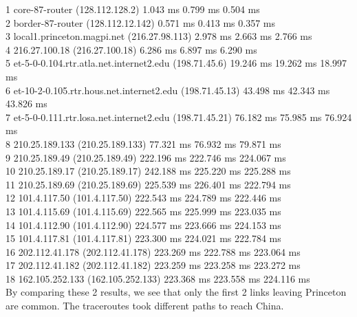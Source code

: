 \documentclass[paper=a4, fontsize=11pt]{scrartcl} %
\numberwithin{equation}{section} %
\numberwithin{figure}{section} %
\numberwithin{table}{section} %
\begin{document}
 1  core-87-router (128.112.128.2)  1.043 ms  0.799 ms  0.504 ms \\
 2  border-87-router (128.112.12.142)  0.571 ms  0.413 ms  0.357 ms \\
 3  local1.princeton.magpi.net (216.27.98.113)  2.978 ms  2.663 ms  2.766 ms \\
 4  216.27.100.18 (216.27.100.18)  6.286 ms  6.897 ms  6.290 ms \\
 5  et-5-0-0.104.rtr.atla.net.internet2.edu (198.71.45.6)  19.246 ms  19.262 ms  18.997 ms \\
 6  et-10-2-0.105.rtr.hous.net.internet2.edu (198.71.45.13)  43.498 ms  42.343 ms  43.826 ms \\
 7  et-5-0-0.111.rtr.losa.net.internet2.edu (198.71.45.21)  76.182 ms  75.985 ms  76.924 ms \\
 8  210.25.189.133 (210.25.189.133)  77.321 ms  76.932 ms  79.871 ms \\
 9  210.25.189.49 (210.25.189.49)  222.196 ms  222.746 ms  224.067 ms \\
10  210.25.189.17 (210.25.189.17)  242.188 ms  225.220 ms  225.288 ms \\
11  210.25.189.69 (210.25.189.69)  225.539 ms  226.401 ms  222.794 ms \\
12  101.4.117.50 (101.4.117.50)  222.543 ms  224.789 ms  222.446 ms \\
13  101.4.115.69 (101.4.115.69)  222.565 ms  225.999 ms  223.035 ms \\
14  101.4.112.90 (101.4.112.90)  224.577 ms  223.666 ms  224.153 ms \\
15  101.4.117.81 (101.4.117.81)  223.300 ms  224.021 ms  222.784 ms \\
16  202.112.41.178 (202.112.41.178)  223.269 ms  222.788 ms  223.064 ms \\
17  202.112.41.182 (202.112.41.182)  223.259 ms  223.258 ms  223.272 ms \\
18  162.105.252.133 (162.105.252.133)  223.368 ms  223.558 ms  224.116 ms
\\

By comparing these 2 results, we see that only the first 2 links leaving Princeton are common. The traceroutes took different paths to reach China.
\\


\end{document}
